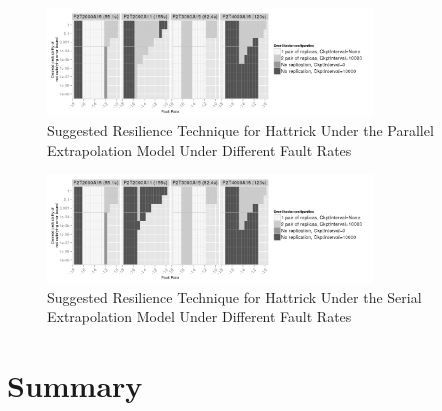 \documentclass[10pt, conference, compsocconf]{IEEEtran}
\begin{document}
\begin{figure}[ht!]
\centering
\includegraphics[width=3.4in]{figs/Hattrick_Parallel_SuggestedConf.png}
\vspace{-10pt}
\caption{Suggested Resilience Technique for Hattrick Under the Parallel Extrapolation Model Under Different Fault Rates}
\vspace{-10pt}
\label{fig:Hattrick_Parallel_SuggestedConf}
\end{figure}

\begin{figure}[ht!]
\centering
\includegraphics[width=3.4in]{figs/Hattrick_Serial_SuggestedConf.png}
\vspace{-10pt}
\caption{Suggested Resilience Technique for Hattrick Under the Serial Extrapolation Model Under Different Fault Rates}
\vspace{-10pt}
\label{fig:Hattrick_Serial_SuggestedConf}
\end{figure}





\section{Summary}
\label{sec:summary}
\end{document}
